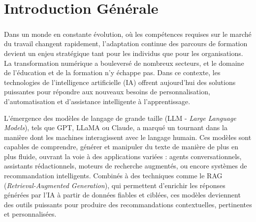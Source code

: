 \pagestyle{fancy}
\fancyhf{}
\fancyhead[L]{\leftmark}
\fancyfoot[R]{\thepage} 

\renewcommand{\chaptermark}[1]{\markboth{#1}{}}
\chapter*{Introduction Générale} 
\paragraph{}

Dans un monde en constante évolution, où les compétences requises sur le marché du travail changent rapidement, l’adaptation continue des parcours de formation devient un enjeu stratégique tant pour les individus que pour les organisations. La transformation numérique a bouleversé de nombreux secteurs, et le domaine de l’éducation et de la formation n’y échappe pas. Dans ce contexte, les technologies de l’intelligence artificielle (IA) offrent aujourd’hui des solutions puissantes pour répondre aux nouveaux besoins de personnalisation, d’automatisation et d’assistance intelligente à l’apprentissage.

L’émergence des modèles de langage de grande taille (LLM - \textit{Large Language Models}), tels que GPT, LLaMA ou Claude, a marqué un tournant dans la manière dont les machines interagissent avec le langage humain. Ces modèles sont capables de comprendre, générer et manipuler du texte de manière de plus en plus fluide, ouvrant la voie à des applications variées : agents conversationnels, assistants rédactionnels, moteurs de recherche augmentés, ou encore systèmes de recommandation intelligents. Combinés à des techniques comme le RAG (\textit{Retrieval-Augmented Generation}), qui permettent d’enrichir les réponses générées par l’IA à partir de données fiables et ciblées, ces modèles deviennent des outils puissants pour produire des recommandations contextuelles, pertinentes et personnalisées.

